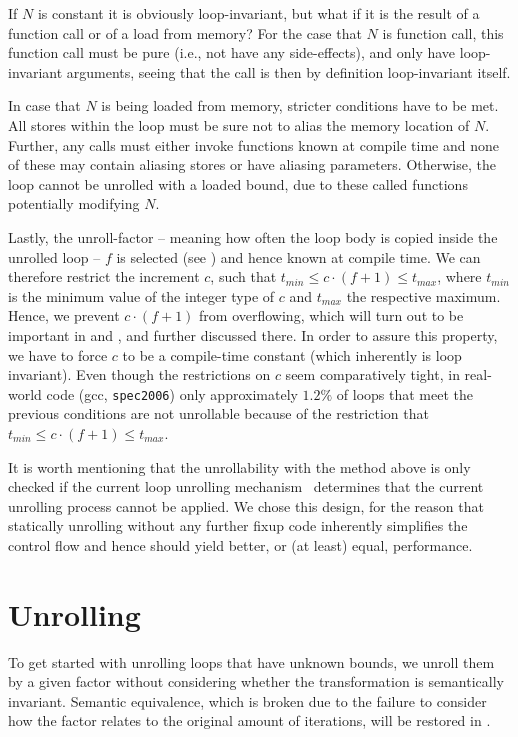 If $N$ is constant it is obviously loop-invariant, but what if it is the result of a function call or of a load from memory?
For the case that $N$ is function call, this function call must be pure (i.e., not have any side-effects), and only have loop-invariant arguments, seeing that the call is then by definition loop-invariant itself.

In case that $N$ is being loaded from memory, stricter conditions have to be met.
All stores within the loop must be sure not to alias the memory location of $N$.
Further, any calls must either invoke functions known at compile time and none of these may contain aliasing stores or have aliasing parameters.
Otherwise, the loop cannot be unrolled with a loaded bound, due to these called functions potentially modifying $N$.

Lastly, the unroll-factor -- meaning how often the loop body is copied inside the unrolled loop -- $f$ is selected (see ) and hence known at compile time.
We can therefore restrict the increment $c$, such that $t_{min} \leq c \cdot (f+1) \leq t_{max}$, where $t_{min}$ is the minimum value of the integer type of $c$ and $t_{max}$ the respective maximum.
Hence, we prevent $c \cdot (f + 1)$ from overflowing, which will turn out to be important in  and , and further discussed there.
In order to assure this property, we have to force $c$ to be a compile-time constant (which inherently is loop invariant).
Even though the restrictions on $c$ seem comparatively tight, in real-world code (gcc, \texttt{spec2006}) only approximately $1.2\%$ of loops that meet the previous conditions are not unrollable because of the restriction that  $t_{min} \leq c \cdot (f+1) \leq t_{max}$.

It is worth mentioning that the unrollability with the method above is only checked if the current loop unrolling mechanism~\cite{aebi18bachelorarbeit} determines that the current unrolling process cannot be applied.
We chose this design, for the reason that statically unrolling without any further fixup code inherently simplifies the control flow and hence should yield better, or (at least) equal, performance.

\section{Unrolling}\label{sec:impl:unroll}

To get started with unrolling loops that have unknown bounds, we unroll them by a given factor without considering whether the transformation is semantically invariant.
Semantic equivalence, which is broken due to the failure to consider how the factor relates to the original amount of iterations, will be restored in .

